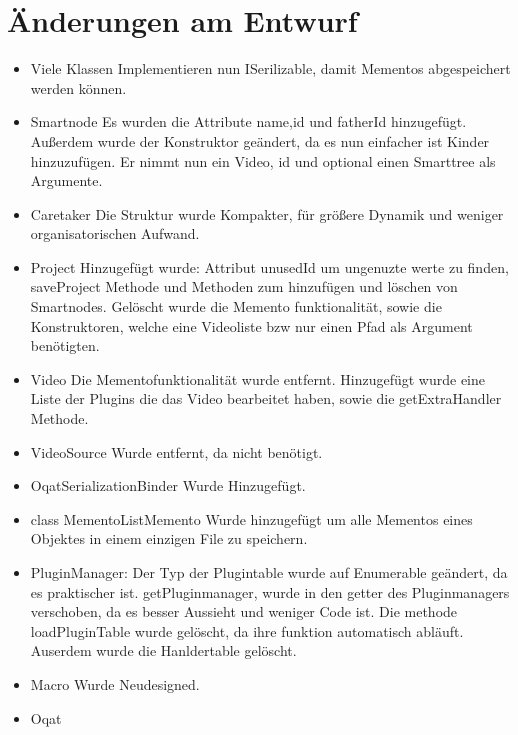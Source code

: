 \chapter{Änderungen am Entwurf}
\begin{itemize}
\item Viele Klassen Implementieren nun ISerilizable, damit Mementos abgespeichert werden können.
\item Smartnode \newline
Es wurden die Attribute name,id und fatherId hinzugefügt. Außerdem wurde der Konstruktor geändert, da es nun einfacher ist Kinder hinzuzufügen. Er nimmt nun ein Video, id und optional einen Smarttree als Argumente.
\item Caretaker \newline
Die Struktur wurde Kompakter, für größere Dynamik und weniger organisatorischen Aufwand.
\item Project \newline
Hinzugefügt wurde: Attribut unusedId um ungenuzte werte zu finden, saveProject Methode und Methoden zum hinzufügen und löschen von Smartnodes. Gelöscht wurde die Memento funktionalität, sowie die Konstruktoren, welche eine Videoliste bzw nur einen Pfad als Argument benötigten.
\item Video \newline
Die Mementofunktionalität wurde entfernt. Hinzugefügt wurde eine Liste der Plugins die das Video bearbeitet haben, sowie die getExtraHandler Methode.
\item VideoSource \newline
Wurde entfernt, da nicht benötigt.
\item OqatSerializationBinder \newline
Wurde Hinzugefügt.
\item class MementoListMemento \newline
Wurde hinzugefügt um alle Mementos eines Objektes in einem einzigen File zu speichern.
\item PluginManager: \newline
Der Typ der Plugintable wurde auf Enumerable geändert, da es praktischer ist. getPluginmanager, wurde in den getter des Pluginmanagers verschoben, da es besser Aussieht und weniger Code ist.
Die methode loadPluginTable wurde gelöscht, da ihre funktion automatisch abläuft. Auserdem wurde die Hanldertable gelöscht.
\item Macro \newline
Wurde Neudesigned.
\item Oqat \newline

\end{itemize}
